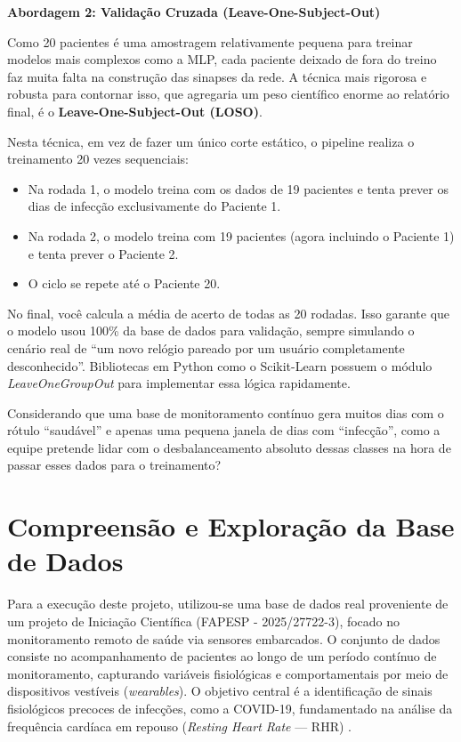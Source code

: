 \begin{description}
    \textbf{Abordagem 2: Validação Cruzada (Leave-One-Subject-Out)}

    Como 20 pacientes é uma amostragem relativamente pequena para treinar modelos mais complexos como a MLP, cada paciente deixado de fora do treino faz muita falta na construção das sinapses da rede. A técnica mais rigorosa e robusta para contornar isso, que agregaria um peso científico enorme ao relatório final, é o \textbf{Leave-One-Subject-Out (LOSO)}.

    Nesta técnica, em vez de fazer um único corte estático, o pipeline realiza o treinamento 20 vezes sequenciais:

    \begin{itemize}
        \item Na rodada 1, o modelo treina com os dados de 19 pacientes e tenta prever os dias de infecção exclusivamente do Paciente 1.
        \item Na rodada 2, o modelo treina com 19 pacientes (agora incluindo o Paciente 1) e tenta prever o Paciente 2.
        \item O ciclo se repete até o Paciente 20.
    \end{itemize}

    No final, você calcula a média de acerto de todas as 20 rodadas. Isso garante que o modelo usou 100\% da base de dados para validação, sempre simulando o cenário real de ``um novo relógio pareado por um usuário completamente desconhecido''. Bibliotecas em Python como o Scikit-Learn possuem o módulo \textit{LeaveOneGroupOut} para implementar essa lógica rapidamente.

    Considerando que uma base de monitoramento contínuo gera muitos dias com o rótulo ``saudável'' e apenas uma pequena janela de dias com ``infecção'', como a equipe pretende lidar com o desbalanceamento absoluto dessas classes na hora de passar esses dados para o treinamento?
\end{description}

\section{Compreensão e Exploração da Base de Dados}

Para a execução deste projeto, utilizou-se uma base de dados real proveniente de um projeto de Iniciação Científica (FAPESP - 2025/27722-3), focado no monitoramento remoto de saúde via sensores embarcados. O conjunto de dados consiste no acompanhamento de pacientes ao longo de um período contínuo de monitoramento, capturando variáveis fisiológicas e comportamentais por meio de dispositivos vestíveis (\textit{wearables}). O objetivo central é a identificação de sinais fisiológicos precoces de infecções, como a COVID-19, fundamentado na análise da frequência cardíaca em repouso (\textit{Resting Heart Rate} — RHR) \cite{nature}.

